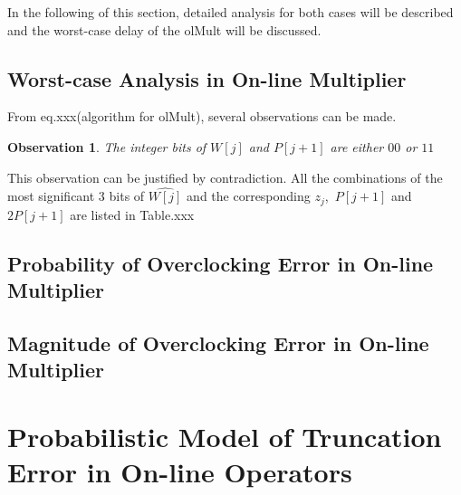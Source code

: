 \documentclass[a4paper, 11pt]{article}
\begin{document}
In the following of this section, detailed analysis for both cases will be described and the worst-case delay of the olMult will be discussed.
\subsection{Worst-case Analysis in On-line Multiplier}
From eq.xxx(algorithm for olMult), several observations can be made. 
\newtheorem{Ob1}{Observation}
\begin{Ob1}
    The integer bits of $W[j]$ and $P[j+1]$ are either $00$ or $11$
\end{Ob1}

This observation can be justified by contradiction. All the combinations of the most significant 3 bits of $\widehat{W[j]}$ and the corresponding $z_j$,~$P[j+1]$ and $2P[j+1]$ are listed in Table.xxx




\subsection{Probability of Overclocking Error in On-line Multiplier}

\subsection{Magnitude of Overclocking Error in On-line Multiplier}

\section{Probabilistic Model of Truncation Error in On-line Operators}
\end{document}
